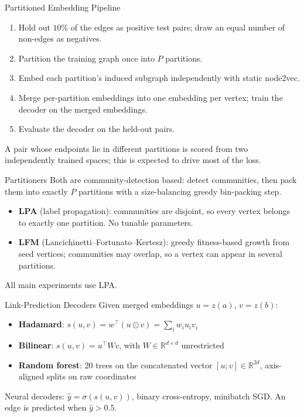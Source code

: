 \documentclass[aspectratio=169]{beamer}
\begin{document}
\begin{frame}{Partitioned Embedding Pipeline}
  \begin{enumerate}
    \item Hold out $10\%$ of the edges as positive test pairs; draw an equal number of non-edges as negatives.
    \item Partition the training graph once into $P$ partitions.
    \item Embed each partition's induced subgraph independently with static node2vec.
    \item Merge per-partition embeddings into one embedding per vertex; train the decoder on the merged embeddings.
    \item Evaluate the decoder on the held-out pairs.
  \end{enumerate}
  \vspace{0.5em}
  A pair whose endpoints lie in different partitions is scored from two independently trained spaces; this is expected to drive most of the loss.
\end{frame}

\begin{frame}{Partitioners}
  Both are community-detection based: detect communities, then pack them into exactly $P$ partitions with a size-balancing greedy bin-packing step.
  \begin{itemize}
    \item \textbf{LPA} (label propagation): communities are disjoint, so every vertex belongs to exactly one partition. No tunable parameters.
    \item \textbf{LFM} (Lancichinetti--Fortunato--Kertesz): greedy fitness-based growth from seed vertices; communities may overlap, so a vertex can appear in several partitions.
  \end{itemize}
  \vspace{0.5em}
  All main experiments use LPA.
\end{frame}

\begin{frame}{Link-Prediction Decoders}
  Given merged embeddings $u = z(a)$, $v = z(b)$:
  \begin{itemize}
    \item \textbf{Hadamard}: $s(u,v) = w^\top (u \odot v) = \sum_{i} w_i u_i v_i$
    \item \textbf{Bilinear}: $s(u,v) = u^\top W v$, with $W \in \mathbb{R}^{d \times d}$ unrestricted
    \item \textbf{Random forest}: 20 trees on the concatenated vector $[u; v] \in \mathbb{R}^{2d}$, axis-aligned splits on raw coordinates
  \end{itemize}
  \vspace{0.5em}
  Neural decoders: $\hat{y} = \sigma(s(u,v))$, binary cross-entropy, minibatch SGD. An edge is predicted when $\hat{y} > 0.5$.
\end{frame}
\end{document}
